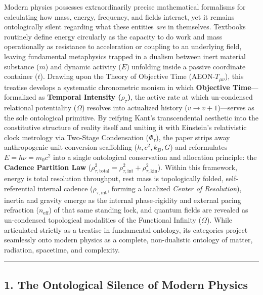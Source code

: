 \documentclass[
]{article}
\begin{document}
Modern physics possesses extraordinarily precise mathematical formalisms
for calculating how mass, energy, frequency, and fields interact, yet it
remains ontologically silent regarding what these entities \emph{are} in
themselves. Textbooks routinely define energy circularly as the capacity
to do work and mass operationally as resistance to acceleration or
coupling to an underlying field, leaving fundamental metaphysics trapped
in a dualism between inert material substance (\(m\)) and dynamic
activity (\(E\)) unfolding inside a passive coordinate container
(\(t\)). Drawing upon the Theory of Objective Time
(\(\text{AEON-}T_{\mu\nu}\)), this treatise develops a systematic
chronometric monism in which \textbf{Objective Time}---formalized as
\textbf{Temporal Intensity (\(\rho_\tau\))}, the active rate at which
un-condensed relational potentiality (\(\Omega\)) resolves into
actualized history (\(v \to v + 1\))---serves as the sole ontological
primitive. By reifying Kant's transcendental aesthetic into the
constitutive structure of reality itself and uniting it with Einstein's
relativistic clock metrology via Two-Stage Condensation (\(\Phi_\tau\)),
the paper strips away anthropogenic unit-conversion scaffolding
(\(h, c^2, k_B, G\)) and reformulates \(E = h\nu = m_0 c^2\) into a
single ontological conservation and allocation principle: the
\textbf{Cadence Partition Law}
(\(\rho_{\tau,\text{total}}^2 = \rho_{\tau,\text{int}}^2 + \rho_{\tau,\text{kin}}^2\)).
Within this framework, energy is total resolution throughput, rest mass
is topologically folded, self-referential internal cadence
(\(\rho_{\tau,\text{int}}\), forming a localized \emph{Center of
Resolution}), inertia and gravity emerge as the internal phase-rigidity
and external pacing refraction (\(n_{\text{eff}}\)) of that same
standing lock, and quantum fields are revealed as un-condensed
topological modalities of the Functional Infinity (\(\Omega\)). While
articulated strictly as a treatise in fundamental ontology, its
categories project seamlessly onto modern physics as a complete,
non-dualistic ontology of matter, radiation, spacetime, and complexity.

\begin{center}\rule{0.5\linewidth}{0.5pt}\end{center}

\subsection{1. The Ontological Silence of Modern
Physics}\label{the-ontological-silence-of-modern-physics}
\end{document}
